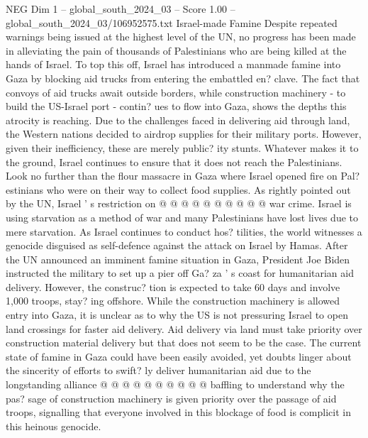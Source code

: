 \begin{textsample}{NEG Dim 1 – global\_south\_2024\_03 – Score 1.00 – global\_south\_2024\_03/106952575.txt}  \label{ex:f1_neg_112}
Israel-made Famine Despite repeated warnings being issued at the highest level of the UN, no progress has been made in alleviating the pain of thousands of Palestinians who are being killed at the hands of Israel.
To top this off, Israel has introduced a manmade famine into Gaza by blocking aid trucks from entering the embattled en? clave.
The fact that convoys of aid trucks await outside borders, while construction machinery - to build the US-Israel port - contin? ues to flow into Gaza, shows the depths this atrocity is reaching.
Due to the challenges faced in delivering aid through land, the Western nations decided to airdrop supplies for their military ports.
However, given their inefficiency, these are merely public? ity stunts.
Whatever makes it to the ground, Israel continues to ensure that it does not reach the Palestinians.
Look no further than the flour massacre in Gaza where Israel opened fire on Pal? estinians who were on their way to collect food supplies.
As rightly pointed out by the UN, Israel ' s restriction on @ @ @ @ @ @ @ @ @ @ war crime.
Israel is using starvation as a method of war and many Palestinians have lost lives due to mere starvation.
As Israel continues to conduct hos? tilities, the world witnesses a genocide disguised as self-defence against the attack on Israel by Hamas.
After the UN announced an imminent famine situation in Gaza, President Joe Biden instructed the military to set up a pier off Ga? za ' s coast for humanitarian aid delivery.
However, the construc? tion is expected to take 60 days and involve 1,000 troops, stay? ing offshore.
While the construction machinery is allowed entry into Gaza, it is unclear as to why the US is not pressuring Israel to open land crossings for faster aid delivery.
Aid delivery via land must take priority over construction material delivery but that does not seem to be the case.
The current state of famine in Gaza could have been easily avoided, yet doubts linger about the sincerity of efforts to swift? ly deliver humanitarian aid due to the longstanding alliance @ @ @ @ @ @ @ @ @ @ baffling to understand why the pas? sage of construction machinery is given priority over the passage of aid troops, signalling that everyone involved in this blockage of food is complicit in this heinous genocide.

\end{textsample}
